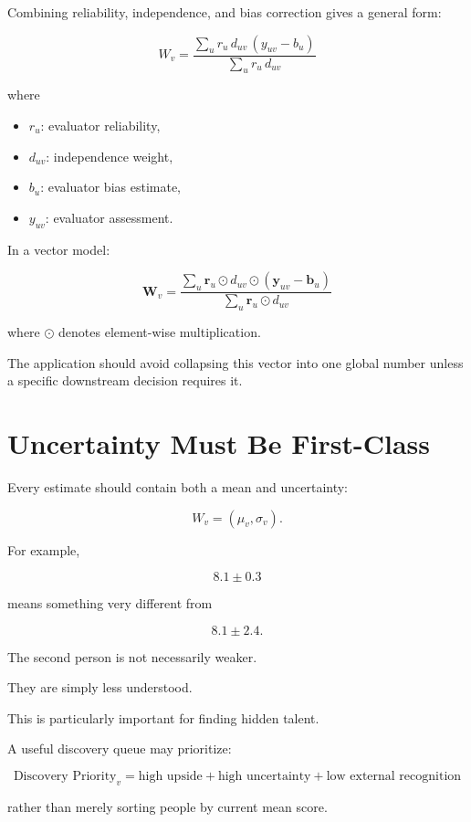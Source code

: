 \documentclass[11pt]{article}
\begin{document}
Combining reliability, independence, and bias correction gives a general form:

\[
\boxed{
W_v
=
\frac{
\sum\limits_u
r_u\,d_{uv}\,(y_{uv}-b_u)
}{
\sum\limits_u r_u\,d_{uv}
}
}
\]

where

\begin{itemize}
    \item \(r_u\): evaluator reliability,
    \item \(d_{uv}\): independence weight,
    \item \(b_u\): evaluator bias estimate,
    \item \(y_{uv}\): evaluator assessment.
\end{itemize}

In a vector model:

\[
\boxed{
\mathbf{W}_v
=
\frac{
\sum\limits_u
\mathbf{r}_u \odot d_{uv}
\odot
(\mathbf{y}_{uv}-\mathbf{b}_u)
}{
\sum\limits_u
\mathbf{r}_u \odot d_{uv}
}
}
\]

where \(\odot\) denotes element-wise multiplication.

The application should avoid collapsing this vector into one global number
unless a specific downstream decision requires it.

\section{Uncertainty Must Be First-Class}

Every estimate should contain both a mean and uncertainty:

\[
W_v
=
(\mu_v,\sigma_v).
\]

For example,

\[
8.1 \pm 0.3
\]

means something very different from

\[
8.1 \pm 2.4.
\]

The second person is not necessarily weaker.

They are simply less understood.

This is particularly important for finding hidden talent.

A useful discovery queue may prioritize:

\[
\boxed{
\text{Discovery Priority}_v
=
\text{high upside}
+
\text{high uncertainty}
+
\text{low external recognition}
}
\]

rather than merely sorting people by current mean score.
\end{document}
